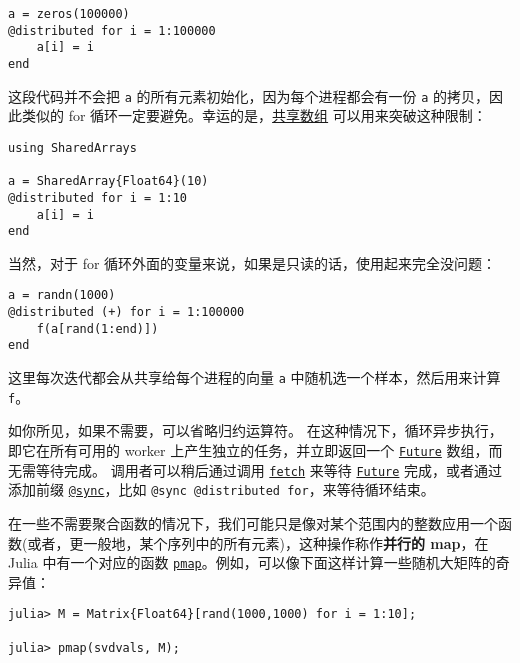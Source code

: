 \begin{verbatim}
a = zeros(100000)
@distributed for i = 1:100000
    a[i] = i
end
\end{verbatim}



这段代码并不会把 \texttt{a} 的所有元素初始化，因为每个进程都会有一份 \texttt{a} 的拷贝，因此类似的 for 循环一定要避免。幸运的是，\hyperlink{879185136139543918}{共享数组} 可以用来突破这种限制：




\begin{verbatim}
using SharedArrays

a = SharedArray{Float64}(10)
@distributed for i = 1:10
    a[i] = i
end
\end{verbatim}



当然，对于 for 循环外面的变量来说，如果是只读的话，使用起来完全没问题：




\begin{verbatim}
a = randn(1000)
@distributed (+) for i = 1:100000
    f(a[rand(1:end)])
end
\end{verbatim}



这里每次迭代都会从共享给每个进程的向量 \texttt{a} 中随机选一个样本，然后用来计算 \texttt{f}。



如你所见，如果不需要，可以省略归约运算符。 在这种情况下，循环异步执行，即它在所有可用的 worker 上产生独立的任务，并立即返回一个 \hyperlink{4170271048165085864}{\texttt{Future}} 数组，而无需等待完成。 调用者可以稍后通过调用 \hyperlink{11007884648860062495}{\texttt{fetch}} 来等待 \hyperlink{4170271048165085864}{\texttt{Future}} 完成，或者通过添加前缀 \hyperlink{7188613740509403855}{\texttt{@sync}}，比如 \texttt{@sync @distributed for}，来等待循环结束。



在一些不需要聚合函数的情况下，我们可能只是像对某个范围内的整数应用一个函数(或者，更一般地，某个序列中的所有元素)，这种操作称作\textbf{并行的 map}，在 Julia 中有一个对应的函数 \hyperlink{9432281416771383761}{\texttt{pmap}}。例如，可以像下面这样计算一些随机大矩阵的奇异值：




\begin{verbatim}
julia> M = Matrix{Float64}[rand(1000,1000) for i = 1:10];

julia> pmap(svdvals, M);
\end{verbatim}



